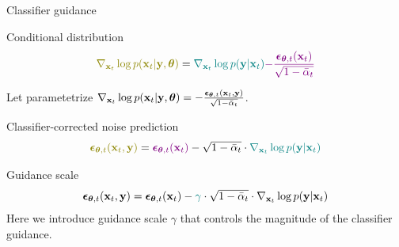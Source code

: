 \begin{frame}{Classifier guidance}
	\begin{block}{Conditional distribution}
		\vspace{-0.3cm}
		\[
			{\color{olive}\nabla_{\bx_t} \log p(\bx_t | \by, \btheta)} = {\color{teal}\nabla_{\bx_t} \log p(\by | \bx_t)} {\color{violet}- \frac{\bepsilon_{\btheta, t}(\bx_t)}{\sqrt{1 - \bar{\alpha}_t}}}
		\]
		\vspace{-0.3cm}
	\end{block}
	Let parametetrize $\nabla_{\mathbf{x}_t} \log p(\mathbf{x}_t | \mathbf{y}, \boldsymbol{\theta}) = - \frac{\boldsymbol{\epsilon}_{\boldsymbol{\theta}, t}(\mathbf{x}_t, \mathbf{y})}{\sqrt{1 - \bar{\alpha}_t}}$.
	\begin{block}{Classifier-corrected noise prediction}
		\vspace{-0.3cm}
		\[
			{\color{olive}\bepsilon_{\btheta, t}(\bx_t, \by)} = {\color{violet}\bepsilon_{\btheta, t}(\bx_t)} - \sqrt{1 - \bar{\alpha}_t} \cdot {\color{teal}\nabla_{\bx_t} \log p(\by | \bx_t)}
		\]
	\end{block}
	\begin{block}{Guidance scale}
		\[
			\boldsymbol{\epsilon}_{\boldsymbol{\theta}, t}(\mathbf{x}_t, \mathbf{y}) = \boldsymbol{\epsilon}_{\boldsymbol{\theta}, t}(\mathbf{x}_t) - {\color{teal}\gamma} \cdot \sqrt{1 - \bar{\alpha}_t} \cdot \nabla_{\mathbf{x}_t} \log p(\mathbf{y} | \mathbf{x}_t)
		\]
		Here we introduce {\color{teal} guidance scale $\gamma$} that controls the magnitude of the classifier guidance.
	\end{block}
\end{frame}

